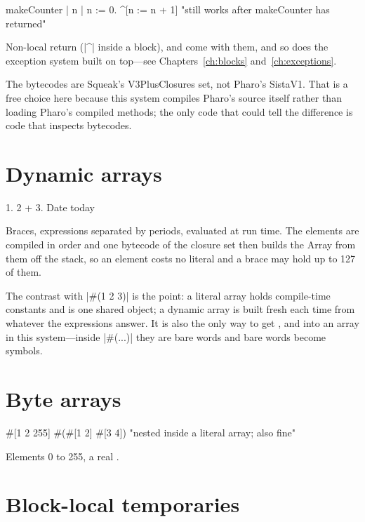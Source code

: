 \begin{st}
makeCounter
    | n |
    n := 0.
    ^[n := n + 1]           "still works after makeCounter has returned"
\end{st}

Non-local return (\ct|^| inside a block),  and
 come with them, and so does the exception system built on
top---see Chapters~\ref{ch:blocks} and~\ref{ch:exceptions}.

The bytecodes are Squeak's V3PlusClosures set, not Pharo's SistaV1. That is a
free choice here because this system compiles Pharo's source itself rather
than loading Pharo's compiled methods; the only code that could tell the
difference is code that inspects bytecodes.

\section{Dynamic arrays}

\begin{st}
{ 1. 2 + 3. Date today }
\end{st}

Braces, expressions separated by periods, evaluated at run time. The
elements are compiled in order and one bytecode of the closure set then
builds the Array from them off the stack, so an element costs no literal
and a brace may hold up to 127 of them.

The contrast with \ct|#(1 2 3)| is the point: a literal array holds
compile-time constants and is one shared object; a dynamic array is built
fresh each time from whatever the expressions answer. It is also the only way
to get ,  and  into an array in this
system---inside \ct|#(...)| they are bare words and bare words become
symbols.

\section{Byte arrays}

\begin{st}
#[1 2 255]
#(#[1 2] #[3 4])        "nested inside a literal array; also fine"
\end{st}

Elements 0 to 255, a real .

\section{Block-local temporaries}

